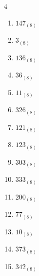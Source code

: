 \begin{multicols}{4}
\begin{enumerate}
        \phantom{$=131$}

  \item $147_{(8)}$

        \phantom{$=103$}

  \item $3_{(8)}$

        \phantom{$=3$}

  \item $136_{(8)}$

        \phantom{$=94$}

\columnbreak %

  \item $36_{(8)}$

        \phantom{$=30$}

  \item $11_{(8)}$

        \phantom{$=9$}

  \item $326_{(8)}$

        \phantom{$=214$}

  \item $121_{(8)}$

        \phantom{$=81$}

  \item $123_{(8)}$

        \phantom{$=83$}

  \item $303_{(8)}$

        \phantom{$=195$}

  \item $333_{(8)}$

        \phantom{$=219$}

  \item $200_{(8)}$

        \phantom{$=128$}

  \item $77_{(8)}$

        \phantom{$=63$}

  \item $10_{(8)}$

        \phantom{$=8$}

  \item $373_{(8)}$

        \phantom{$=251$}

  \item $342_{(8)}$

        \phantom{$=226$}


\end{enumerate}
\end{multicols}
